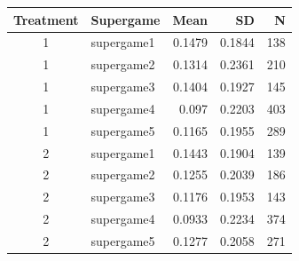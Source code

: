 \begin{tabular}{clrrr}
  \toprule
  Treatment & Supergame & Mean & SD & N \\ 
  \midrule
  1 & supergame1 & 0.1479 & 0.1844 & 138 \\ 
  1 & supergame2 & 0.1314 & 0.2361 & 210 \\ 
  1 & supergame3 & 0.1404 & 0.1927 & 145 \\ 
  1 & supergame4 & 0.097 & 0.2203 & 403 \\ 
  1 & supergame5 & 0.1165 & 0.1955 & 289 \\ 
  2 & supergame1 & 0.1443 & 0.1904 & 139 \\ 
  2 & supergame2 & 0.1255 & 0.2039 & 186 \\ 
  2 & supergame3 & 0.1176 & 0.1953 & 143 \\ 
  2 & supergame4 & 0.0933 & 0.2234 & 374 \\ 
  2 & supergame5 & 0.1277 & 0.2058 & 271 \\ 
  \bottomrule
\end{tabular}
